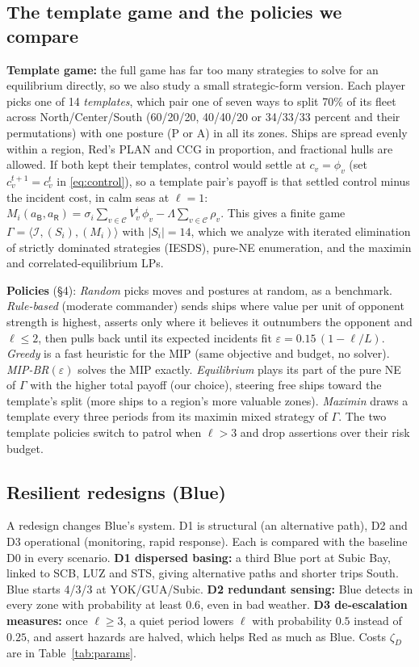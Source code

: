 \documentclass[10pt]{article}
\newcommand{\I}{\mathcal{I}}
\newcommand{\C}{\mathcal{C}}
\newcommand{\1}{\mathbf{1}}
\newcommand{\B}{\mathsf{B}}
\newcommand{\Rd}{\mathsf{R}}
\begin{document}
\subsection{The template game and the policies we compare}\label{sec:policies}
\textbf{Template game:} the full game has far too many strategies to solve for an equilibrium directly, so we
also study a small strategic-form version. Each player picks one of 14 \emph{templates}, which pair one of seven ways to split
70\% of its fleet across North/Center/South (60/20/20, 40/40/20 or 34/33/33 percent and their permutations) with one
posture (P or A) in all its zones. Ships are spread evenly within a region, Red's PLAN and CCG in proportion, and
fractional hulls are allowed. If both kept their
templates, control would settle at $c_v=\phi_v$ (set $c^{t+1}_v=c^t_v$ in \eqref{eq:control}), so a template
pair's payoff is that settled control minus the incident cost, in calm seas at $\ell=1$:
$M_i(a_\B,a_\Rd)=\sigma_i\textstyle\sum_{v\in\C}V^i_v\,\phi_v-\Lambda\sum_{v\in\C}\rho_v$. This gives a finite game $\Gamma=\langle\I,(S_i),(M_i)\rangle$ with $|S_i|=14$, which we analyze with iterated
elimination of strictly dominated strategies (IESDS), pure-NE enumeration, and the maximin and correlated-equilibrium LPs.

\textbf{Policies} (\S4): \emph{Random} picks moves and postures at random, as a benchmark. \emph{Rule-based}
(moderate commander) sends ships where value per unit of opponent strength is highest, asserts only where it believes
it outnumbers the opponent and $\ell\le2$, then pulls back until its expected incidents fit $\varepsilon=0.15\,(1-\ell/L)$.
\emph{Greedy} is a fast heuristic for the MIP (same objective and budget, no solver). \emph{MIP-BR}$(\varepsilon)$
solves the MIP exactly. \emph{Equilibrium} plays its part of the pure NE of $\Gamma$ with the higher total payoff
(our choice), steering free ships toward the template's split (more ships to a region's more valuable zones).
\emph{Maximin} draws a template every three periods from its maximin mixed strategy of $\Gamma$. The two template policies switch to patrol when $\ell>3$ and drop
assertions over their risk budget.

\subsection{Resilient redesigns (Blue)}\label{sec:designs}
A redesign changes Blue's system. D1 is structural (an alternative
path), D2 and D3 operational (monitoring, rapid response). Each is compared with the baseline D0 in every scenario.
\textbf{D1 dispersed basing:} a third Blue port at Subic Bay, linked to SCB, LUZ and STS, giving
alternative paths and shorter trips South. Blue starts 4/3/3 at YOK/GUA/Subic. \textbf{D2 redundant sensing:} Blue
detects in every zone with probability at least $0.6$, even in bad weather. \textbf{D3 de-escalation measures:} once $\ell\ge3$, a quiet period lowers $\ell$ with probability $0.5$ instead of $0.25$, and assert
hazards are halved, which helps Red as much as Blue. Costs $\zeta_D$ are in Table~\ref{tab:params}.
\end{document}
